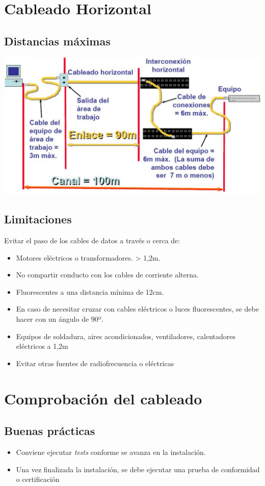 \documentclass[11pt]{article}
\begin{document}
\section{Cableado Horizontal}
\label{sec:org6949c6e}
\subsection{Distancias máximas}
\label{sec:org9cae635}
\begin{center}
\includegraphics[width=.9\linewidth]{./media/distancias-maximas.png}
\end{center}
\subsection{Limitaciones}
\label{sec:org511fccd}
Evitar el paso de los cables de datos a través o cerca de:
\begin{itemize}
\item Motores eléctricos o transformadores. > 1,2m.
\item No compartir conducto con los cables de corriente alterna.
\item Fluorescentes a una distancia mínima de 12cm.
\item En caso de necesitar cruzar con cables eléctricos o luces fluorescentes, se debe hacer con un ángulo de 90º.
\item Equipos de soldadura, aires acondicionados, ventiladores, calentadores eléctricos a 1,2m
\item Evitar otras fuentes de radiofrecuencia o eléctricas
\end{itemize}
\section{Comprobación del cableado}
\label{sec:orgcf00c4e}
\subsection{Buenas prácticas}
\label{sec:org51353b7}
\begin{itemize}
\item Conviene ejecutar \emph{tests} conforme se avanza en la instalación.
\item Una vez finalizada la instalación, se debe ejecutar una prueba de conformidad o certificación
\end{itemize}
\end{document}
